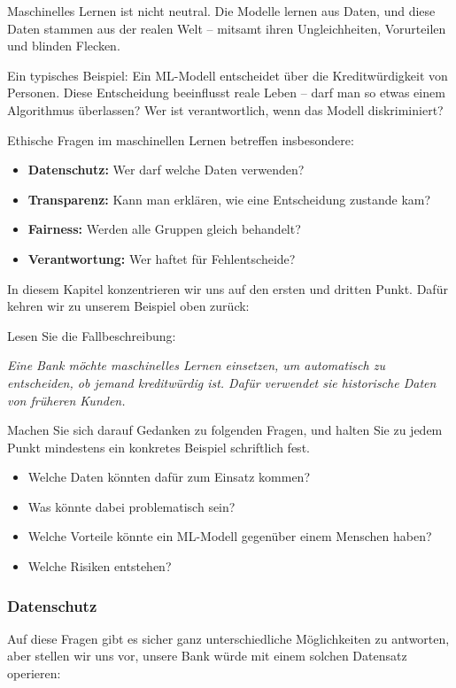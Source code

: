 \begin{lpu}

Maschinelles Lernen ist nicht neutral. Die Modelle lernen aus Daten, und diese Daten stammen aus der realen Welt – mitsamt ihren Ungleichheiten, Vorurteilen und blinden Flecken.

Ein typisches Beispiel: Ein ML-Modell entscheidet über die Kreditwürdigkeit von Personen. Diese Entscheidung beeinflusst reale Leben – darf man so etwas einem Algorithmus überlassen? Wer ist verantwortlich, wenn das Modell diskriminiert?

Ethische Fragen im maschinellen Lernen betreffen insbesondere:
\begin{itemize}
  \item \textbf{Datenschutz:} Wer darf welche Daten verwenden?
  \item \textbf{Transparenz:} Kann man erklären, wie eine Entscheidung zustande kam?
  \item \textbf{Fairness:} Werden alle Gruppen gleich behandelt?
  \item \textbf{Verantwortung:} Wer haftet für Fehlentscheide?
\end{itemize}

In diesem Kapitel konzentrieren wir uns auf den ersten und dritten Punkt. Dafür kehren wir zu unserem Beispiel oben zurück:

\begin{aufgabe}{1}
Lesen Sie die Fallbeschreibung:

\emph{Eine Bank möchte maschinelles Lernen einsetzen, um automatisch zu entscheiden, ob jemand kreditwürdig ist. Dafür verwendet sie historische Daten von früheren Kunden.}

Machen Sie sich darauf Gedanken zu folgenden Fragen, und halten Sie zu jedem Punkt mindestens ein konkretes Beispiel schriftlich fest.

\begin{itemize}
  \item Welche Daten könnten dafür zum Einsatz kommen?
  \item Was könnte dabei problematisch sein?
  \item Welche Vorteile könnte ein ML-Modell gegenüber einem Menschen haben?
  \item Welche Risiken entstehen?
\end{itemize}
\end{aufgabe}

\subsubsection*{Datenschutz}
Auf diese Fragen gibt es sicher ganz unterschiedliche Möglichkeiten zu antworten, aber stellen wir uns vor, unsere Bank würde mit einem solchen Datensatz operieren:


\end{lpu}
